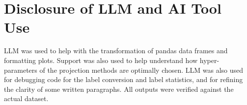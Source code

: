 \section{Disclosure of LLM and AI Tool Use}

LLM was used to help with the transformation of pandas data frames and formatting plots. Support was also used to help understand how hyper-parameters of the projection methods are optimally chosen. LLM was also used for debugging code for the label conversion and label statistics, and for refining the clarity of some written paragraphs. All outputs were verified against the actual dataset.